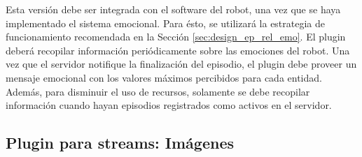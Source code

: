 Esta versión debe ser integrada con el software del robot, una vez que se haya implementado el sistema emocional. Para ésto, se utilizará la estrategia de funcionamiento recomendada en la Sección \ref{sec:design_ep_rel_emo}. El plugin deberá recopilar información periódicamente sobre las emociones del robot. Una vez que el servidor notifique la finalización del episodio, el plugin debe proveer un mensaje emocional con los valores máximos percibidos para cada entidad. Además, para disminuir el uso de recursos, solamente se debe recopilar información cuando hayan episodios registrados como activos en el servidor.

%
%
%


\subsection{Plugin para streams: Imágenes}

